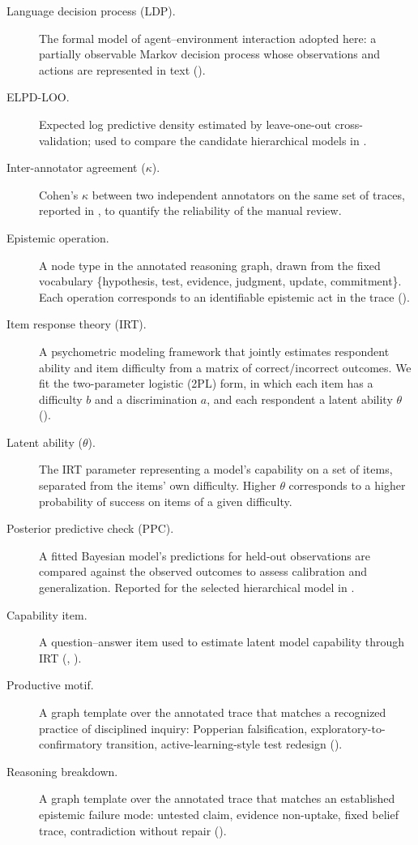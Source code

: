\begin{description}
    \item[Language decision process (LDP).] The formal model of agent--environment interaction adopted here: a partially observable Markov decision process whose observations and actions are represented in text ().
    \item[ELPD-LOO.] Expected log predictive density estimated by leave-one-out cross-validation; used to compare the candidate hierarchical models in .
    \item[Inter-annotator agreement ($\kappa$).] Cohen's $\kappa$ between two independent annotators on the same set of traces, reported in , to quantify the reliability of the manual review.
    \item[Epistemic operation.] A node type in the annotated reasoning graph, drawn from the fixed vocabulary \{hypothesis, test, evidence, judgment, update, commitment\}. Each operation corresponds to an identifiable epistemic act in the trace ().
    \item[Item response theory (IRT).] A psychometric modeling framework that jointly estimates respondent ability and item difficulty from a matrix of correct/incorrect outcomes. We fit the two-parameter logistic (2PL) form, in which each item has a difficulty $b$ and a discrimination $a$, and each respondent a latent ability $\theta$ ().
    \item[Latent ability ($\theta$).] The IRT parameter representing a model's capability on a set of items, separated from the items' own difficulty. Higher $\theta$ corresponds to a higher probability of success on items of a given difficulty.
    \item[Posterior predictive check (PPC).] A fitted Bayesian model's predictions for held-out observations are compared against the observed outcomes to assess calibration and generalization. Reported for the selected hierarchical model in .
    \item[Capability item.] A question--answer item used to estimate latent model capability through IRT (, ).
    \item[Productive motif.] A graph template over the annotated trace that matches a recognized practice of disciplined inquiry: Popperian falsification, exploratory-to-confirmatory transition, active-learning-style test redesign ().
    \item[Reasoning breakdown.] A graph template over the annotated trace that matches an established epistemic failure mode: untested claim, evidence non-uptake, fixed belief trace, contradiction without repair ().
\end{description}



